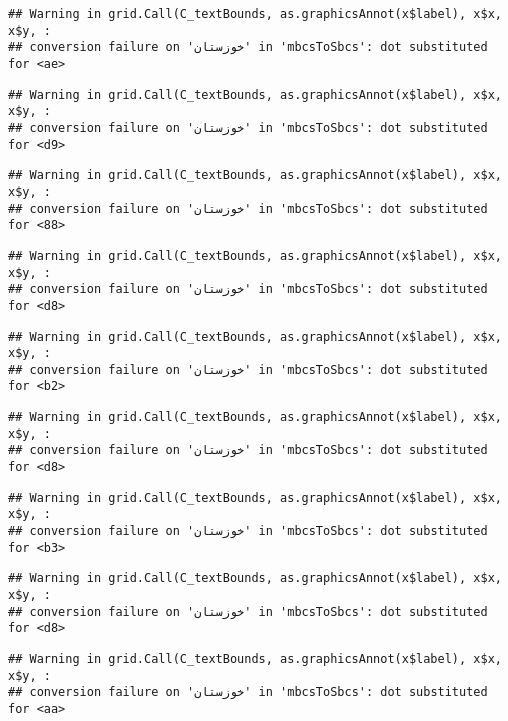 \documentclass[
]{article}
\begin{document}
\begin{verbatim}
## Warning in grid.Call(C_textBounds, as.graphicsAnnot(x$label), x$x, x$y, :
## conversion failure on 'خوزستان' in 'mbcsToSbcs': dot substituted for <ae>
\end{verbatim}

\begin{verbatim}
## Warning in grid.Call(C_textBounds, as.graphicsAnnot(x$label), x$x, x$y, :
## conversion failure on 'خوزستان' in 'mbcsToSbcs': dot substituted for <d9>
\end{verbatim}

\begin{verbatim}
## Warning in grid.Call(C_textBounds, as.graphicsAnnot(x$label), x$x, x$y, :
## conversion failure on 'خوزستان' in 'mbcsToSbcs': dot substituted for <88>
\end{verbatim}

\begin{verbatim}
## Warning in grid.Call(C_textBounds, as.graphicsAnnot(x$label), x$x, x$y, :
## conversion failure on 'خوزستان' in 'mbcsToSbcs': dot substituted for <d8>
\end{verbatim}

\begin{verbatim}
## Warning in grid.Call(C_textBounds, as.graphicsAnnot(x$label), x$x, x$y, :
## conversion failure on 'خوزستان' in 'mbcsToSbcs': dot substituted for <b2>
\end{verbatim}

\begin{verbatim}
## Warning in grid.Call(C_textBounds, as.graphicsAnnot(x$label), x$x, x$y, :
## conversion failure on 'خوزستان' in 'mbcsToSbcs': dot substituted for <d8>
\end{verbatim}

\begin{verbatim}
## Warning in grid.Call(C_textBounds, as.graphicsAnnot(x$label), x$x, x$y, :
## conversion failure on 'خوزستان' in 'mbcsToSbcs': dot substituted for <b3>
\end{verbatim}

\begin{verbatim}
## Warning in grid.Call(C_textBounds, as.graphicsAnnot(x$label), x$x, x$y, :
## conversion failure on 'خوزستان' in 'mbcsToSbcs': dot substituted for <d8>
\end{verbatim}

\begin{verbatim}
## Warning in grid.Call(C_textBounds, as.graphicsAnnot(x$label), x$x, x$y, :
## conversion failure on 'خوزستان' in 'mbcsToSbcs': dot substituted for <aa>
\end{verbatim}
\end{document}
